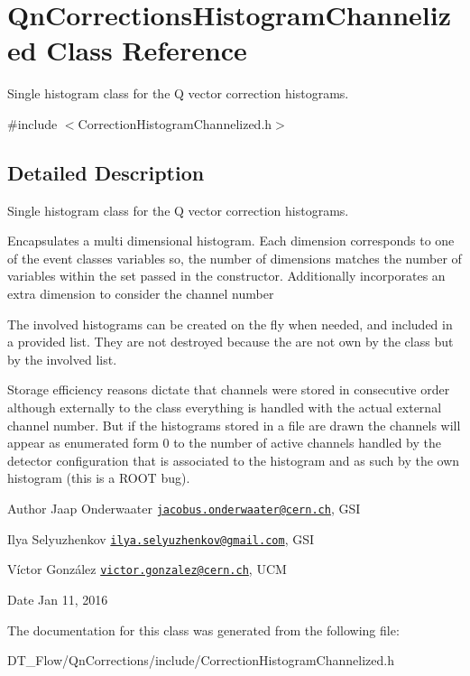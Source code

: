 \hypertarget{classQnCorrectionsHistogramChannelized}{}\section{Qn\+Corrections\+Histogram\+Channelized Class Reference}
\label{classQnCorrectionsHistogramChannelized}


Single histogram class for the Q vector correction histograms.  




{\ttfamily \#include $<$Correction\+Histogram\+Channelized.\+h$>$}



\subsection{Detailed Description}
Single histogram class for the Q vector correction histograms. 

Encapsulates a multi dimensional histogram. Each dimension corresponds to one of the event classes variables so, the number of dimensions matches the number of variables within the set passed in the constructor. Additionally incorporates an extra dimension to consider the channel number

The involved histograms can be created on the fly when needed, and included in a provided list. They are not destroyed because the are not own by the class but by the involved list.

Storage efficiency reasons dictate that channels were stored in consecutive order although externally to the class everything is handled with the actual external channel number. But if the histograms stored in a file are drawn the channels will appear as enumerated form 0 to the number of active channels handled by the detector configuration that is associated to the histogram and as such by the own histogram (this is a R\+O\+OT bug).

\begin{DoxyAuthor}{Author}
Jaap Onderwaater \href{mailto:jacobus.onderwaater@cern.ch}{\tt jacobus.\+onderwaater@cern.\+ch}, G\+SI 

Ilya Selyuzhenkov \href{mailto:ilya.selyuzhenkov@gmail.com}{\tt ilya.\+selyuzhenkov@gmail.\+com}, G\+SI 

Víctor González \href{mailto:victor.gonzalez@cern.ch}{\tt victor.\+gonzalez@cern.\+ch}, U\+CM 
\end{DoxyAuthor}
\begin{DoxyDate}{Date}
Jan 11, 2016 
\end{DoxyDate}


The documentation for this class was generated from the following file\+:\begin{DoxyCompactItemize}
\item 
D\+T\+\_\+\+Flow/\+Qn\+Corrections/include/Correction\+Histogram\+Channelized.\+h\end{DoxyCompactItemize}
